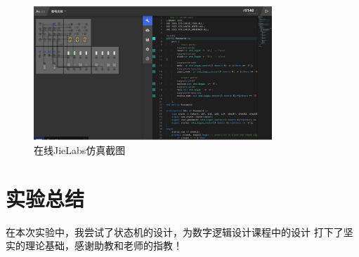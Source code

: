 \documentclass[UTF8]{article}
\begin{document}
\begin{figure}[h]
    \label{md}
    \centering
        \includegraphics[width=0.8\textwidth]{p1.png}
        \caption{在线JieLabs仿真截图}
    \end{figure}

\section{实验总结}
在本次实验中，我尝试了状态机的设计，为数字逻辑设计课程中的设计
打下了坚实的理论基础，感谢助教和老师的指教！



\end{document}
